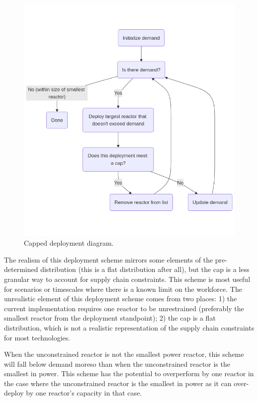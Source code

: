 \begin{figure}[H]
    \centering
    \includegraphics[scale=0.4]{images/schemes/cap_diagram.png}
    \caption{Capped deployment diagram.}
    \label{fig:cap_diagram}
\end{figure}

The realism of this deployment scheme mirrors some elements of the
pre-determined distribution (this is a flat distribution after all), but the
cap is a less granular way to account for supply chain constraints. This scheme
is most useful for scenarios or timescales where there is a known limit on the
workforce. The unrealistic element of this deployment scheme comes from two
places: 1) the current implementation requires one reactor to be unrestrained
(preferably the smallest reactor from the deployment standpoint); 2) the cap is
a flat distribution, which is not a realistic representation of the supply
chain constraints for most technologies.

When the unconstrained reactor is not the smallest power reactor, this scheme
will fall below demand moreso than when the unconstrained reactor is the
smallest in power. This scheme has the potential to overperform by one reactor
in the case where the unconstrained reactor is the smallest in power as it can
over-deploy by one reactor's capacity in that case.

